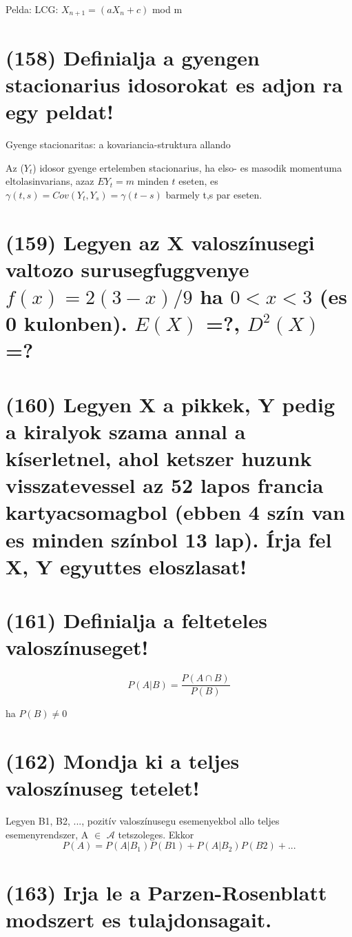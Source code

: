 \documentclass[12p]{article}
\begin{document}
Pelda: LCG: $X_{n+1} = (aX_n + c)$ mod m

\section{(158) Definialja a gyengen stacionarius idosorokat es adjon ra egy peldat!}

Gyenge stacionaritas: a kovariancia-struktura allando

Az ($Y_t$) idosor gyenge ertelemben stacionarius, ha elso- es masodik momentuma eltolasinvarians, azaz $EY_t = m$ minden $t$ eseten, es $\gamma(t,s) = Cov(Y_t, Y_s) = \gamma(t - s)$ barmely t,s par eseten.

\section{(159) Legyen az X valoszínusegi valtozo surusegfuggvenye $f(x) = 2(3 - x)/9$ ha $0 < x < 3$ (es 0 kulonben). $E(X)$ =?, $D^2(X)$ =? }

\section{(160) Legyen X a pikkek, Y pedig a kiralyok szama annal a kíserletnel, ahol ketszer huzunk
visszatevessel az 52 lapos francia kartyacsomagbol (ebben 4 szín van es minden színbol 13
lap). Írja fel X, Y egyuttes eloszlasat!}

\section{(161) Definialja a felteteles valoszínuseget!}

$$P(A|B) = \frac{P(A \cap B)}{P(B)}$$

ha $P(B) \neq 0$

\section{(162) Mondja ki a teljes valoszínuseg tetelet!}

Legyen B1, B2, ..., pozitív valoszínusegu esemenyekbol allo teljes esemenyrendszer, A $\in$ $\mathscr{A}$ tetszoleges. Ekkor
$$P(A) = P(A|B_1)P(B1)+P(A|B_2)P(B2)+ ...$$


\section{(163) Irja le a Parzen-Rosenblatt modszert es tulajdonsagait.}
\end{document}
